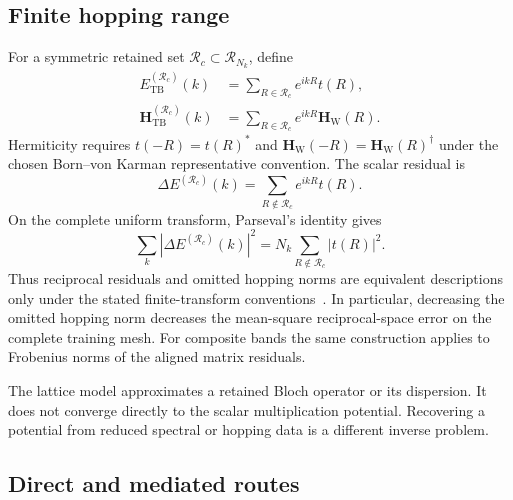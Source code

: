 \subsection{Finite hopping range}

For a symmetric retained set $\mathcal R_c\subset\mathcal R_{N_k}$, define
\begin{align}
    E_{\mathrm{TB}}^{(\mathcal R_c)}(k)
    &=
    \sum_{R\in\mathcal R_c}e^{ikR}t(R),
    \\
    \mathbf H_{\mathrm{TB}}^{(\mathcal R_c)}(k)
    &=
    \sum_{R\in\mathcal R_c}e^{ikR}\mathbf H_{\mathrm W}(R).
\end{align}
Hermiticity requires $t(-R)=t(R)^\ast$ and
$\mathbf H_{\mathrm W}(-R)=\mathbf H_{\mathrm W}(R)^\dagger$ under the chosen
Born--von Karman representative convention. The scalar residual is
\begin{equation}
    \Delta E^{(\mathcal R_c)}(k)
    =
    \sum_{R\notin\mathcal R_c}e^{ikR}t(R).
\end{equation}
On the complete uniform transform, Parseval's identity gives
\begin{equation}
    \sum_k\left|\Delta E^{(\mathcal R_c)}(k)\right|^2
    =
    N_k\sum_{R\notin\mathcal R_c}|t(R)|^2.
    \label{eq:periodic-1d-parseval}
\end{equation}
Thus reciprocal residuals and omitted hopping norms are equivalent descriptions
only under the stated finite-transform conventions~\cite{trefethen2000}. In particular, decreasing
the omitted hopping norm decreases the mean-square reciprocal-space error on
the complete training mesh. For composite bands the same construction applies
to Frobenius norms of the aligned matrix residuals.

The lattice model approximates a retained Bloch operator or its dispersion. It
does not converge directly to the scalar multiplication potential. Recovering a
potential from reduced spectral or hopping data is a different inverse problem.

\subsection{Direct and mediated routes}

